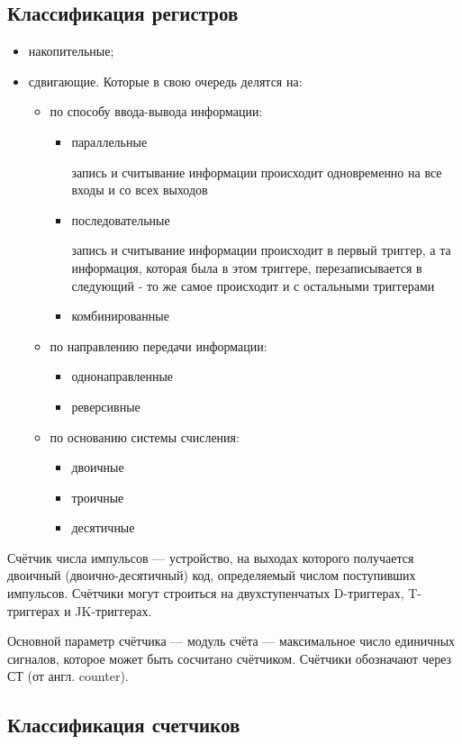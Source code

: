 \documentclass[unicode, 12pt, a4paper, oneside]{article}
\begin{document}
\subsection*{Классификация регистров}

\begin{itemize}
\item накопительные;
\item сдвигающие. Которые в свою очередь делятся на:
	\begin{itemize}
	\item по способу ввода-вывода информации:
		\begin{itemize}
		\item параллельные
			\par запись и считывание информации происходит одновременно на все входы и со всех выходов
		\item последовательные
			\par запись и считывание информации происходит в первый триггер, а та информация, которая была в этом триггере, перезаписывается в следующий - то же самое происходит и с остальными триггерами
		\item комбинированные
		\end{itemize}
	\item по направлению передачи информации:
		\begin{itemize}
			\item однонаправленные
			\item реверсивные
		\end{itemize}
	\item по основанию системы счисления:
		\begin{itemize}
			\item двоичные
			\item троичные
			\item десятичные
		\end{itemize}
	\end{itemize}
\end{itemize}

Счётчик числа импульсов — устройство, на выходах которого получается двоичный (двоично-десятичный) код, определяемый числом поступивших импульсов. Счётчики могут строиться на двухступенчатых D-триггерах, T-триггерах и JK-триггерах.

Основной параметр счётчика — модуль счёта — максимальное число единичных сигналов, которое может быть сосчитано счётчиком. Счётчики обозначают через СТ (от англ. counter).

\subsection*{Классификация счетчиков}
\end{document}
